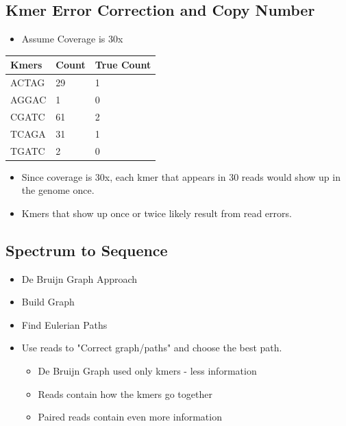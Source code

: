 \documentclass[10pt]{article}
\begin{document}
\subsection*{Kmer Error Correction and Copy Number}
\begin{itemize}
    \item Assume Coverage is 30x
\end{itemize}
\begin{center}
    \begin{tabular}{|l|l|l|}
        \hline
        \textbf{Kmers} & \textbf{Count} & \textbf{True Count} \\ \hline
        ACTAG & 29 & 1 \\
        AGGAC & 1 & 0 \\
        CGATC & 61 & 2 \\
        TCAGA & 31 & 1 \\
        TGATC & 2 & 0 \\ \hline
        \end{tabular}
\end{center}
\begin{itemize}
    \item Since coverage is 30x, each kmer that appears in 30 reads would show up in the genome once.
    \item Kmers that show up once or twice likely result from read errors.
\end{itemize}

\subsection*{Spectrum to Sequence}
\begin{itemize}
    \item De Bruijn Graph Approach
    \item Build Graph
    \item Find Eulerian Paths
    \item Use reads to "Correct graph/paths" and choose the best path.
    \begin{itemize}
        \item De Bruijn Graph used only kmers - less information
        \item Reads contain how the kmers go together
        \item Paired reads contain even more information
    \end{itemize}
\end{itemize}
\end{document}
